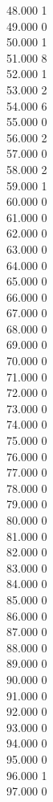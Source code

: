 { 48.000	1 \\
 49.000	0 \\
 50.000	1 \\
 51.000	8 \\
 52.000	1 \\
 53.000	2 \\
 54.000	6 \\
 55.000	0 \\
 56.000	2 \\
 57.000	0 \\
 58.000	2 \\
 59.000	1 \\
 60.000	0 \\
 61.000	0 \\
 62.000	0 \\
 63.000	0 \\
 64.000	0 \\
 65.000	0 \\
 66.000	0 \\
 67.000	0 \\
 68.000	0 \\
 69.000	0 \\
 70.000	0 \\
 71.000	0 \\
 72.000	0 \\
 73.000	0 \\
 74.000	0 \\
 75.000	0 \\
 76.000	0 \\
 77.000	0 \\
 78.000	0 \\
 79.000	0 \\
 80.000	0 \\
 81.000	0 \\
 82.000	0 \\
 83.000	0 \\
 84.000	0 \\
 85.000	0 \\
 86.000	0 \\
 87.000	0 \\
 88.000	0 \\
 89.000	0 \\
 90.000	0 \\
 91.000	0 \\
 92.000	0 \\
 93.000	0 \\
 94.000	0 \\
 95.000	0 \\
 96.000	1 \\
 97.000	0 \\
}
